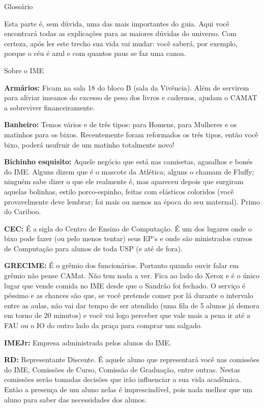 \begin{secao}{Glossário}

Esta parte é, sem dúvida, uma das mais importantes do guia. Aqui você
encontrará todas as explicações para as maiores dúvidas do universo. Com
certeza, após ler este trecho sua vida vai mudar: você saberá, por exemplo,
porque o céu é azul e com quantos paus se faz uma canoa.

\begin{subsecao}{Sobre o IME}

{\bf Armários:} Ficam na sala 18 do bloco B (sala da Vivência). Além de
servirem para aliviar imeanos do excesso de peso dos livros e cadernos, ajudam
o CAMAT a sobreviver financeiramente.

{\bf Banheiro:} Temos vários e de três tipos: para Homens, para Mulheres e os
matinhos para os bixos. Recentemente foram reformados os três tipos, então você
bixo, poderá usufruir de um matinho totalmente novo!

{\bf Bichinho esquisito:} Aquele negócio que está nas camisetas, agasalhos e
bonés do IME. Alguns dizem que é o mascote da Atlética; alguns o chamam de
Fluffy; ninguém sabe dizer o que ele realmente é, mas apareceu depois que
surgiram aquelas bolinhas, estilo porco-espinho, feitas com elásticos
coloridos (você provavelmente deve lembrar; foi mais ou menos na época do seu
maternal). Primo do Cariboo.

{\bf CEC:} É a sigla do Centro de Ensino de Computação. É um dos lugares onde o
bixo pode fazer (ou pelo menos tentar) seus EP's e onde são ministrados cursos
de Computação para alunos de toda USP (e até de fora).

{\bf GRECIME:} É o grêmio dos funcionários. Portanto quando ouvir falar em
grêmio não pense CAMat. Não tem nada a ver. Fica ao lado do Xerox e é o único
lugar que vende comida no IME desde que o Sandrão foi fechado. O serviço é péssimo
e as chances são que, se você pretende comer por lá durante o intervalo entre as
aulas, não vai dar tempo de ser atendido (uma fila de 5 alunos já demora em torno
de 20 minutos) e você vai logo perceber que vale mais a pena ir até a FAU ou o IO
do outro lado da praça para comprar um salgado.

{\bf IMEJr:} Empresa administrada pelos alunos do IME.

{\bf RD:} Representante Discente. É aquele aluno que representará você nas
comissões do IME, Comissões de Curso, Comissão de Graduação, entre outras.
Nestas comissões serão tomadas decisões que irão influenciar a sua vida
acadêmica. Então a presença de um aluno nelas é imprescindível, pois nada
melhor que um aluno para saber das necessidades dos alunos.


\end{subsecao}
\end{secao}
